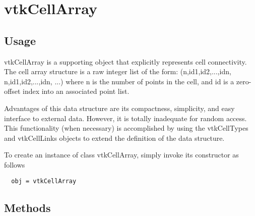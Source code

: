 \section{vtkCellArray}

\subsection{Usage}

 vtkCellArray is a supporting object that explicitly represents cell 
 connectivity. The cell array structure is a raw integer list
 of the form: (n,id1,id2,...,idn, n,id1,id2,...,idn, ...)
 where n is the number of points in the cell, and id is a zero-offset index 
 into an associated point list.

 Advantages of this data structure are its compactness, simplicity, and 
 easy interface to external data.  However, it is totally inadequate for 
 random access.  This functionality (when necessary) is accomplished by 
 using the vtkCellTypes and vtkCellLinks objects to extend the definition of 
 the data structure.


To create an instance of class vtkCellArray, simply
invoke its constructor as follows
\begin{verbatim}
  obj = vtkCellArray
\end{verbatim}
\subsection{Methods}


